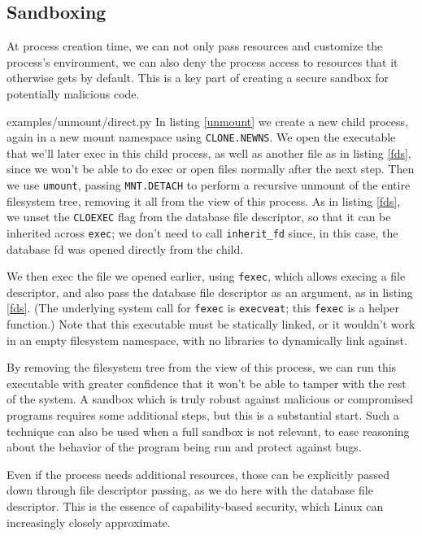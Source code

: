 \documentclass[sigplan]{acmart}
\begin{document}
\subsection{Sandboxing}
At process creation time,
we can not only pass resources and customize the process's environment,
we can also deny the process access to resources that it otherwise gets by default.
This is a key part of creating a secure sandbox for potentially malicious code.


{examples/unmount/direct.py}
In listing \ref{unmount}
we create a new child process,
again in a new mount namespace using \texttt{CLONE.NEWNS}.
We open the executable that we'll later exec in this child process,
as well as another file as in listing \ref{fds},
since we won't be able to do exec or open files normally after the next step.
Then we use \texttt{umount},
passing \texttt{MNT.DETACH} to perform a recursive unmount of the entire filesystem tree,
removing it all from the view of this process.
As in listing \ref{fds}, we unset the \texttt{CLOEXEC} flag from the database file descriptor,
so that it can be inherited across \texttt{exec};
we don't need to call \verb|inherit_fd| since, in this case, the database fd was opened directly from the child.

We then exec the file we opened earlier, using \texttt{fexec},
which allows execing a file descriptor,
and also pass the database file descriptor as an argument,
as in listing \ref{fds}.
(The underlying system call for \texttt{fexec} is \texttt{execveat};
this \texttt{fexec} is a helper function.)
Note that this executable must be statically linked,
or it wouldn't work in an empty filesystem namespace,
with no libraries to dynamically link against.

By removing the filesystem tree from the view of this process,
we can run this executable with greater confidence
that it won't be able to tamper with the rest of the system.
A sandbox which is truly robust against malicious or compromised programs requires some additional steps,
but this is a substantial start.
Such a technique can also be used when a full sandbox is not relevant,
to ease reasoning about the behavior of the program being run
and protect against bugs.

Even if the process needs additional resources,
those can be explicitly passed down through file descriptor passing,
as we do here with the database file descriptor.
This is the essence of capability-based security,
which Linux can increasingly closely approximate.
\end{document}
